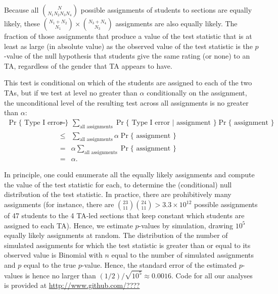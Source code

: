 \documentclass[12pt]{article}
\newcommand{\todo}[1]{{\color{red}{TO DO: \sc #1}}}
\begin{document}
Because all ${N}\choose{N_1 N_2 N_3 N_4}$ possible assignments of students
to sections are equally likely, these 
${{N_1 + N_2} \choose {N_1}} \times {{N_3+N_4} \choose {N_3}}$ 
assignments are also equally likely.
The fraction of those assignments that produce a value of the test statistic that
is at least as large (in absolute value) as the observed value of the test statistic
is the $p$-value of the null hypothesis that students give the same rating (or none) to
an TA, regardless of the gender that TA appears to have.

This test is conditional on which of the students are assigned to each of the two 
TAs, but if we test at level no greater than $\alpha$ conditionally on the
assignment, the unconditional level of the resulting test across all assignments is no 
greater than $\alpha$:
\begin{eqnarray}
   \Pr \{ \mbox{ Type I error } \} &=& \sum_{\mbox{all assignments}} \Pr \{ \mbox{ Type I error } | 
   \mbox{ assignment } \} \Pr\{\mbox{ assignment } \} \nonumber \\
   &\le& 
    \sum_{\mbox{all assignments}} \alpha \Pr\{\mbox{ assignment } \} \nonumber \\
    &=& \alpha \sum_{\mbox{all assignments}} \Pr\{\mbox{ assignment } \} \nonumber \\
    &=& \alpha.
\end{eqnarray}

In principle, one could enumerate all the equally likely assignments and compute the value
of the test statistic for each, to determine the (conditional) null distribution of the test
statistic.
In practice, there are prohibitively many assignments
(for instance, there are ${{23}\choose{11}}{{24}\choose{11}} > 3.3\times 10^{12}$ 
possible assignments
of 47 students to the 4 TA-led sections that keep constant which
students are assigned to each TA).
Hence, we estimate $p$-values by simulation, drawing $10^5$ equally likely assignments
at random.
The distribution of the number of simulated assignments for which the test statistic
is greater than or equal to its observed value is Binomial with $n$ equal to the number of
simulated assignments and $p$ equal to the true $p$-value.
Hence, the standard error of the estimated $p$-values is hence no larger than 
$(1/2)/ \sqrt{10^5}
\approx 0.0016$.
Code for all our analyses is provided at \url{http://www.github.com/????} \todo{Fix!}
\end{document}
